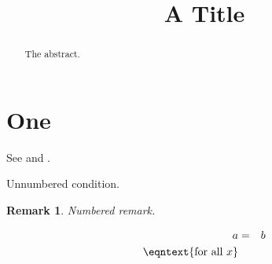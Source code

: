 \documentclass[bj]{arxbj}
\newtheorem{rem}{Remark}
\begin{document}
\begin{frontmatter}
\title{A Title}
\begin{aug}
\author{ }
\end{aug}
\begin{abstract}The abstract.\end{abstract}
\begin{keyword}[class=AMS]
\end{keyword}
\begin{keyword}
\end{keyword}
\end{frontmatter}
\section{One}
See  and .
\begin{cnd*}Unnumbered condition.\end{cnd*}
\begin{rem}Numbered remark.\end{rem}
\begin{eqnarray}
a &=& b \nonumber\\
\eqntext{\mbox{for all } x}
\end{eqnarray}
\begin{supplement}[id=suppA]
\end{supplement}
\end{document}
